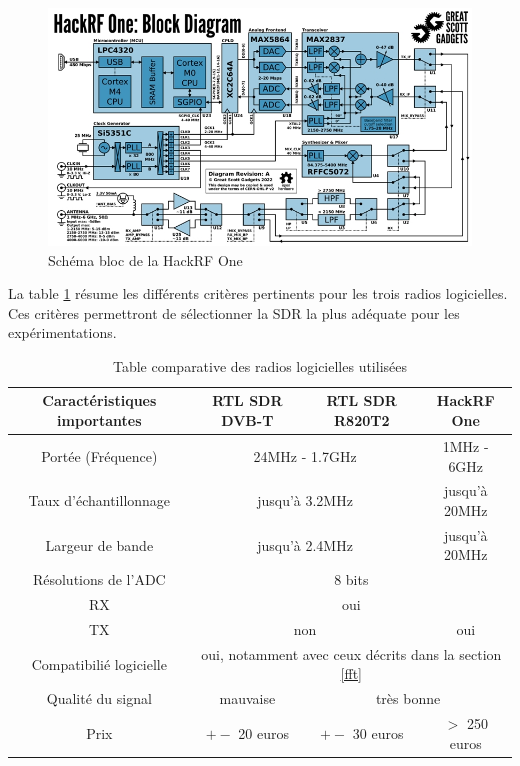 \begin{figure}[h]
\centering

\includegraphics[scale=0.8]{images/SBhackrf.png}
\caption{Schéma bloc de la HackRF One\protect\footnotemark[10]}\label{term3001}
\end{figure}

 
La table \ref{table1} résume les différents critères pertinents pour les trois radios logicielles. Ces critères permettront de sélectionner la SDR la plus adéquate pour les expérimentations.


\begin{table}[h]
\centering
\begin{adjustbox}{width=1\textwidth}
\begin{tabular}{|c|c|c|c|}
\hline
\multicolumn{1}{|c|}{Caractéristiques importantes} & \multicolumn{1}{c|}{RTL SDR DVB-T} & \multicolumn{1}{c|}{RTL SDR R820T2} & \multicolumn{1}{c|}{HackRF One}\\
\hline
Portée (Fréquence) & \multicolumn{2}{c|}{24MHz - 1.7GHz} & 1MHz - 6GHz \\
\hline
Taux d'échantillonnage & \multicolumn{2}{c|}{jusqu'à 3.2MHz} & jusqu'à 20MHz \\
\hline
Largeur de bande & \multicolumn{2}{c|}{jusqu'à 2.4MHz} & jusqu'à 20MHz  \\
\hline
Résolutions de l'ADC & \multicolumn{3}{c|}{8 bits} \\
\hline
RX & \multicolumn{3}{c|}{oui} \\
\hline
TX & \multicolumn{2}{c|}{non} & oui \\
\hline
Compatibilié logicielle & \multicolumn{3}{c|}{oui, notamment avec ceux décrits dans la section \ref{fft}} \\
\hline
Qualité du signal & mauvaise &\multicolumn{2}{c|}{très bonne}\\
\hline
Prix & $+-$ 20 euros & $+-$ 30 euros & $>$ 250 euros \\
\hline
\end{tabular}
\end{adjustbox}
\caption{Table comparative des radios logicielles utilisées}
\label{table1}
\end{table}



